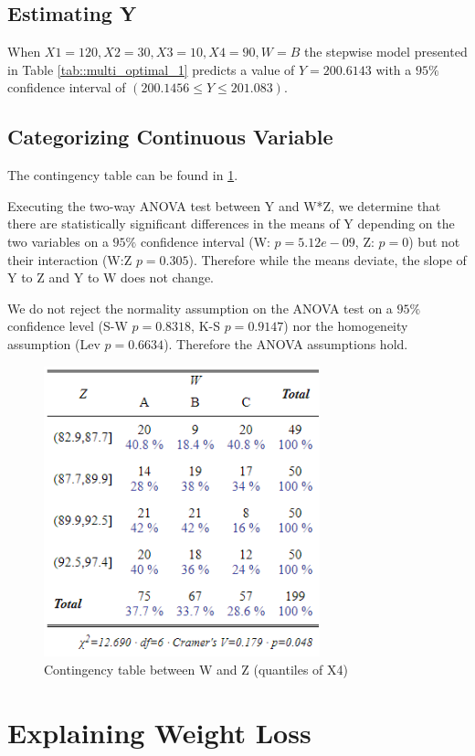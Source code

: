 \documentclass[12pt, a4paper]{article}
\begin{document}
	
	\subsection{Estimating Y}
	
	When $X1=120, X2=30, X3=10, X4=90, W=B$ the stepwise model presented in Table \ref{tab::multi_optimal_1} predicts a value of $Y=200.6143$ with a $95\%$ confidence interval of $(200.1456 \leq Y \leq 201.083)$.
	
	
	\subsection{Categorizing Continuous Variable}
	The contingency table can be found in \ref{fig::contigency_1}.
	
	Executing the two-way ANOVA test between Y and W*Z, we determine that there are statistically significant differences in the means of Y depending on the two variables on a $95\%$ confidence interval (W: $p=5.12e-09$, Z: $p=0$) but not their interaction (W:Z $p= 0.305$). Therefore while the means deviate, the slope of Y to Z and Y to W does not change.
	
	We do not reject the normality assumption on the ANOVA test on a $95\%$ confidence level (S-W $p=0.8318$, K-S $p=0.9147$) nor the homogeneity assumption (Lev $p=0.6634$). Therefore the ANOVA assumptions hold.
	
	\begin{figure}
		\includegraphics[width=8cm]{contigency_1.png}
		\centering
		\caption{Contingency table between W and Z (quantiles of X4)}
		\label{fig::contigency_1}
	\end{figure}
	
	
	\section{Explaining Weight Loss}
	
\end{document}
